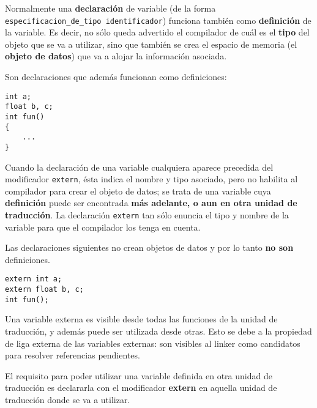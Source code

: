 Normalmente una \textbf{declaración} de variable (de la forma \lstinline{especificacion_de_tipo identificador}) funciona
también como \textbf{definición} de la variable. Es decir, no sólo queda advertido el compilador de cuál es el
\textbf{tipo} del objeto que se va a utilizar, sino que también se crea el espacio de memoria (el \textbf{objeto de datos})
que va a alojar la información asociada.

\begin{ejemplo}
Son declaraciones que además funcionan como definiciones:
\begin{lstlisting}
int a;
float b, c;
int fun() 
{
	...
}
\end{lstlisting}
\end{ejemplo}


Cuando la declaración de una variable cualquiera aparece precedida del modificador \lstinline{extern}, ésta indica el nombre y tipo asociado, pero no habilita al compilador para crear el objeto de datos; se trata de una variable cuya \textbf{definición} puede ser encontrada
\textbf{más adelante, o aun en otra unidad de traducción}. La declaración \lstinline{extern} tan sólo enuncia el tipo y nombre de la variable para que el compilador los tenga en cuenta.

\begin{ejemplo}
Las declaraciones siguientes no crean objetos de datos y por lo tanto \textbf{no son} definiciones.
\begin{lstlisting}
extern int a;
extern float b, c;
int fun();
\end{lstlisting}
\end{ejemplo}

Una variable externa es visible desde todas las funciones de la unidad de traducción, y además puede ser
utilizada desde otras. Esto se debe a la propiedad de liga externa de las variables externas: son visibles
al linker como candidatos para resolver referencias pendientes.

El requisito para poder utilizar una variable definida en otra unidad de traducción es declararla con el
modificador \textbf{extern} en aquella unidad de traducción donde se va a utilizar.


